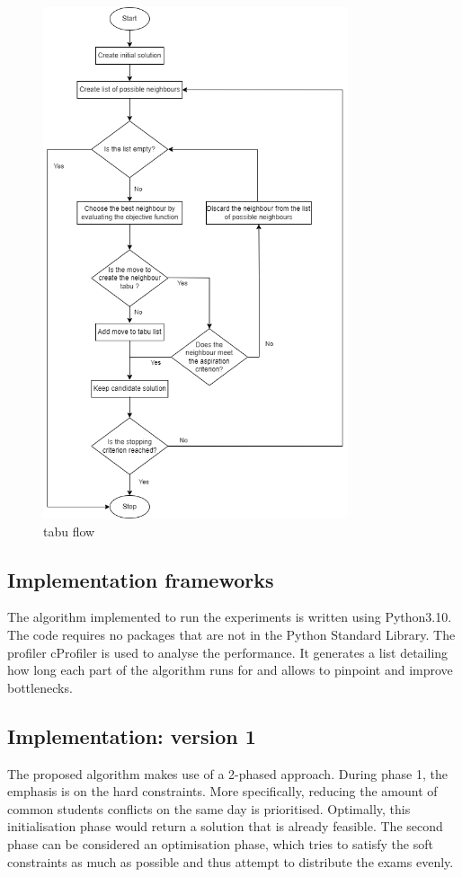 \begin{figure}[h]
	\centering
	\includegraphics[width=0.8\textwidth]{images/tabu.drawio.png} 
	\caption{\acrlong{tabu} flow}
	\label{fig:tabu-chart}
\end{figure}

\subsection{Implementation frameworks}

The algorithm implemented to run the experiments is written using Python3.10. The code requires no packages that are not in the Python Standard Library. The profiler cProfiler is used to analyse the performance. It generates a list detailing how long each part of the algorithm runs for and allows to pinpoint and improve bottlenecks.

\subsection{Implementation: version 1}
The proposed algorithm makes use of a 2-phased approach. During phase 1, the emphasis is on the hard constraints. More specifically, reducing the amount of common students conflicts on the same day is prioritised. Optimally, this initialisation phase would return a solution that is already feasible. The second phase can be considered an optimisation phase, which tries to satisfy the soft constraints as much as possible and thus attempt to distribute the exams evenly.

